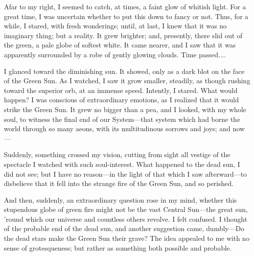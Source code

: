 Afar to my right, I seemed to catch, at times, a faint glow of whitish light. For a great time, I was uncertain whether to put this down to fancy or not. Thus, for a while, I stared, with fresh wonderings; until, at last, I knew that it was no imaginary thing; but a reality. It grew brighter; and, presently, there slid out of the green, a pale globe of softest white. It came nearer, and I saw that it was apparently surrounded by a robe of gently glowing clouds. Time passed....

I glanced toward the diminishing sun. It showed, only as a dark blot on the face of the Green Sun. As I watched, I saw it grow smaller, steadily, as though rushing toward the superior orb, at an immense speed. Intently, I stared. What would happen? I was conscious of extraordinary emotions, as I realized that it would strike the Green Sun. It grew no bigger than a pea, and I looked, with my whole soul, to witness the final end of our System---that system which had borne the world through so many aeons, with its multitudinous sorrows and joys; and now---

Suddenly, something crossed my vision, cutting from sight all vestige of the spectacle I watched with such soul-interest. What happened to the dead sun, I did not see; but I have no reason---in the light of that which I saw afterward---to disbelieve that it fell into the strange fire of the Green Sun, and so perished.

And then, suddenly, an extraordinary question rose in my mind, whether this stupendous globe of green fire might not be the vast Central Sun---the great sun, ’round which our universe and countless others revolve. I felt confused. I thought of the probable end of the dead sun, and another suggestion came, dumbly---Do the dead stars make the Green Sun their grave? The idea appealed to me with no sense of grotesqueness; but rather as something both possible and probable.

\clearpage
